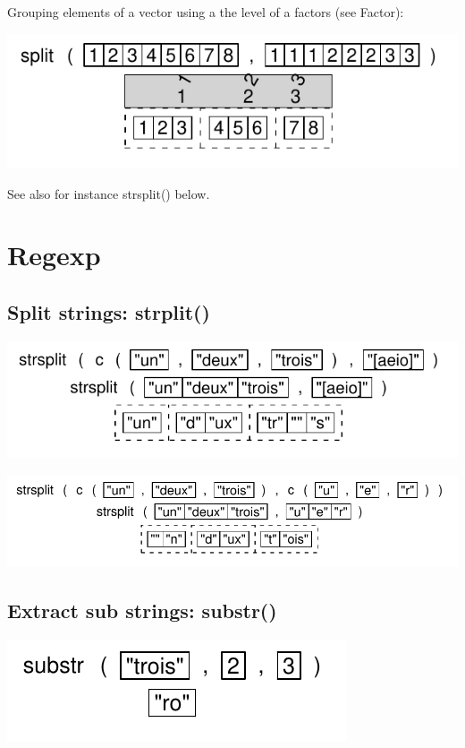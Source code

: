 \documentclass[pdflatex]{article}
\begin{document}
Grouping elements of a vector using a the level of a factors (see Factor):

\includegraphics{split}

See also for instance strsplit() below.

\section{Regexp}

\subsection{Split strings: strplit()}

\includegraphics{strsplit.pdf}

\includegraphics{strsplit_2.pdf}

\subsection{Extract sub strings: substr()}

\includegraphics{substr.pdf}
\end{document}

